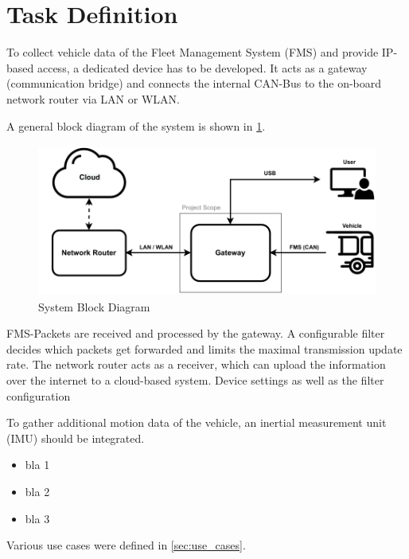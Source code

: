 \section{Task Definition}
To collect vehicle data of the Fleet Management System (FMS) and provide IP-based access, a dedicated device has to be developed. It acts as a gateway (communication bridge) and connects the internal CAN-Bus to the on-board network router via LAN or WLAN.


A general block diagram of the system is shown in \cref{fig:constellation_HW}.

\medskip
\begin{figure}[h!]
	\centering
	\includegraphics[height=5cm]{images/Block_Diagram}
	\caption{System Block Diagram}
	\label{fig:constellation_HW}
\end{figure}

FMS-Packets are received and processed by the gateway. A configurable filter decides which packets get forwarded and limits the maximal transmission update rate. The network router acts as a receiver, which can upload the information  over the internet to a cloud-based system.
Device settings as well as the filter configuration

To gather additional motion data of the vehicle, an inertial measurement unit (IMU) should be integrated.

\begin{itemize}
	\item bla 1
	\item bla 2
	\item bla 3
\end{itemize}

Various use cases were defined in \cref{sec:use_cases}.